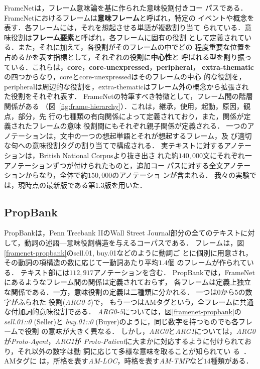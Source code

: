 \documentclass[japanese]{jnlp_1.4}
\begin{document}
FrameNetは，フレーム意味論\cite{fillmore1976}を基に作られた意味役割付きコー
パスである．FrameNetにおけるフレームは{\bf 意味フレーム}と呼ばれ，特定の
イベントや概念を表す．各フレームには，それを想起させる単語が複数割り当て
られている．意味役割は{\bf フレーム要素}と呼ばれ，各フレームに固有の役割
として定義されている．また，それに加えて，各役割がそのフレームの中でどの
程度重要な位置を占めるかを表す指標として，それぞれの役割に{\bf 中心性}と
呼ばれる型を割り振っている．これらは，{\bf core}，{\bf core-unexpressed}，{\bf peripheral}，
{\bf extra-thematic}の四つからなり，coreとcore-unexpressedはそのフレームの中心
的な役割を，
peripheralは周辺的な役割を，extra-thematicはフレーム外の概念から拡張され
た役割をそれぞれ表す．
FrameNetの特筆すべき特徴として，フレーム間の階層関係がある
（図~\ref{fig:frame-hierarchy}）．これは，継承，使用，起動，原因，観点，部分，先
行の七種類の有向関係によって定義されており，また，関係が定義されたフレームの意味
役割間にもそれぞれ親子関係が定義される．
一つのアノテーションは，文中の一つの想起単語とそれが想起するフレーム，及
び適切な句への意味役割タグの割り当てで構成される．
実テキストに対するアノテーションは，British National Corpusより抜き出さ
れた約$140,000$文にそれぞれ一アノテーションずつが付けられたものと，追加コー
パスに対する全文アノテーションからなり，全体で約$150,000$のアノテーショ
ンが含まれる．
我々の実験では，現時点の最新版である第$1.3$版を用いた．


\subsection{PropBank}
\label{sec:propbank}

PropBankは，Penn Treebank IIのWall Street Journal部分の全てのテキストに対
して，動詞の述語—意味役割構造を与えるコーパスである．
フレームは，図\ref{framenet-propbank}のsell.01, buy.01などのように動詞ご
とに個別に用意され，その動詞の項構造の数に応じて一動詞あたり平均$1.4$個
のフレームが作られている．
テキスト部には$112,917$アノテーションを含む．
PropBankでは，FrameNetにあるようなフレーム間の関係は定義されておらず，
各フレームは定義上独立な関係である．一方，意味役割の定義は二種類に分かれる．
一つは$0$から$5$の数字がふられた
役割({\it ARG0-5})で，
もう一つはAMタグという，全フレームに共通な付加詞的意味役割である．
{\it ARG0-5}については，図\ref{framenet-propbank}の{\it sell.01::0} (Seller)と
{\it buy.01::0} (Buyer)のように，同じ数字を持つものでも各フレームで役割
の意味が大きく異なる．
しかし，{\it ARG0}と{\it ARG1}については，{\it ARG0}が{\it Proto-Agent}，{\it ARG1}が
{\it Proto-Patient}に大まかに対応するように付けられており，それ以外の数字は動
詞に応じて多様な意味を取ることが知られてい
る~．AMタグに
は，所格を表す{\it AM-LOC}，時格を表す{\it AM-TMP}など$14$種類がある．
\end{document}
